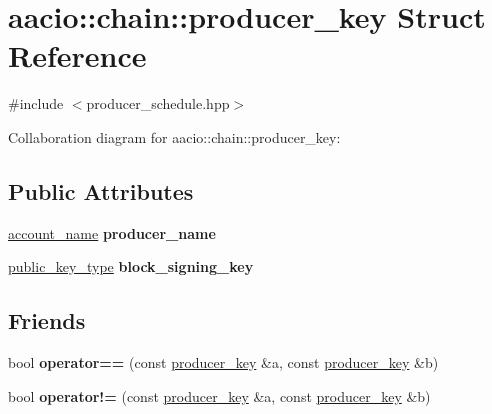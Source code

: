 \hypertarget{structaacio_1_1chain_1_1producer__key}{}\section{aacio\+:\+:chain\+:\+:producer\+\_\+key Struct Reference}
\label{structaacio_1_1chain_1_1producer__key}


{\ttfamily \#include $<$producer\+\_\+schedule.\+hpp$>$}



Collaboration diagram for aacio\+:\+:chain\+:\+:producer\+\_\+key\+:
\subsection*{Public Attributes}
\begin{DoxyCompactItemize}
\item 
\mbox{\label{structaacio_1_1chain_1_1producer__key_ae37c2657d522a3f2e88410b22a1d151a}} 
\mbox{\hyperlink{structaacio_1_1chain_1_1name}{account\+\_\+name}} {\bfseries producer\+\_\+name}
\item 
\mbox{\label{structaacio_1_1chain_1_1producer__key_af6157ba13a4a67135409751018e74144}} 
\mbox{\hyperlink{classfc_1_1crypto_1_1public__key}{public\+\_\+key\+\_\+type}} {\bfseries block\+\_\+signing\+\_\+key}
\end{DoxyCompactItemize}
\subsection*{Friends}
\begin{DoxyCompactItemize}
\item 
\mbox{\label{structaacio_1_1chain_1_1producer__key_a9564de360085f36943856d9563d8f0d7}} 
bool {\bfseries operator==} (const \mbox{\hyperlink{structaacio_1_1chain_1_1producer__key}{producer\+\_\+key}} \&a, const \mbox{\hyperlink{structaacio_1_1chain_1_1producer__key}{producer\+\_\+key}} \&b)
\item 
\mbox{\label{structaacio_1_1chain_1_1producer__key_a909edd99dcb811e8db9a96b1255fcfdb}} 
bool {\bfseries operator!=} (const \mbox{\hyperlink{structaacio_1_1chain_1_1producer__key}{producer\+\_\+key}} \&a, const \mbox{\hyperlink{structaacio_1_1chain_1_1producer__key}{producer\+\_\+key}} \&b)
\end{DoxyCompactItemize}


